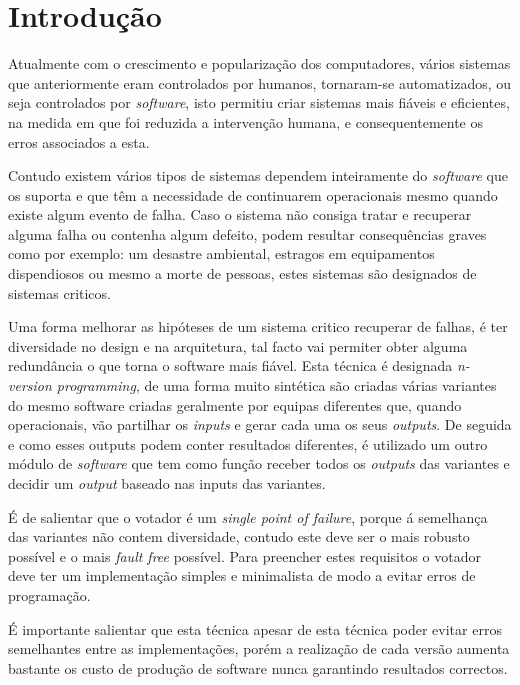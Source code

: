 \chapter*{Introdução}
\label{cha:introducao}
Atualmente com o crescimento e popularização dos computadores, vários sistemas que anteriormente eram controlados por humanos, tornaram-se automatizados, ou seja controlados por \textit{software}, isto permitiu criar sistemas mais fiáveis e eficientes, na medida em que foi reduzida a intervenção humana, e consequentemente os erros associados a esta. \par
Contudo existem vários tipos de sistemas dependem inteiramente do \textit{software} que os suporta e que têm a necessidade de continuarem operacionais mesmo quando existe algum evento de falha. Caso o sistema não consiga tratar e recuperar alguma falha ou contenha algum defeito, podem resultar consequências graves como por exemplo: um desastre ambiental, estragos em equipamentos dispendiosos ou mesmo a morte de pessoas, estes sistemas são designados de sistemas criticos. \par
Uma forma melhorar as hipóteses de um sistema critico recuperar de falhas, é ter diversidade no design e na arquitetura, tal facto vai permiter obter alguma redundância o que torna o software mais fiável. Esta técnica é designada \textit{n-version programming}, de uma forma muito sintética são criadas várias variantes do mesmo software criadas geralmente por equipas diferentes que, quando operacionais, vão partilhar os \textit{inputs} e gerar cada uma os seus \textit{outputs}. De seguida e como esses outputs podem conter resultados diferentes, é utilizado um outro módulo de \textit{software} que tem como função receber todos os \textit{outputs} das variantes e decidir um \textit{output} baseado nas inputs das variantes. \par
É de salientar que o votador é um \textit{single point of failure}, porque á semelhança das variantes não contem diversidade, contudo este deve ser o mais robusto possível e o mais \textit{fault free} possível. Para preencher estes requisitos o votador deve ter um implementação simples e minimalista de modo a evitar erros de programação. \par
É importante salientar que esta técnica apesar de esta técnica poder evitar erros semelhantes entre as implementações, porém a realização de cada versão aumenta bastante os custo de produção de software nunca garantindo resultados correctos.
